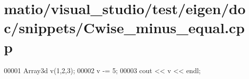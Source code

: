\hypertarget{matio_2visual__studio_2test_2eigen_2doc_2snippets_2_cwise__minus__equal_8cpp_source}{}\section{matio/visual\+\_\+studio/test/eigen/doc/snippets/\+Cwise\+\_\+minus\+\_\+equal.cpp}
\label{matio_2visual__studio_2test_2eigen_2doc_2snippets_2_cwise__minus__equal_8cpp_source}

\begin{DoxyCode}
00001 Array3d v(1,2,3);
00002 v -= 5;
00003 cout << v << endl;
\end{DoxyCode}
